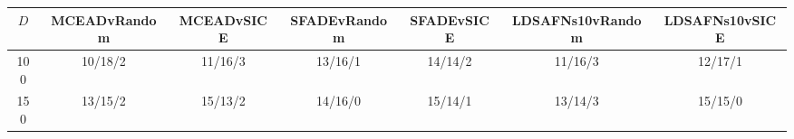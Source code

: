 \begin{tabular}{c c c c c c c}\hline\hline
	$D$	&	MCEADvRandom	&	MCEADvSICE	&	SFADEvRandom	&	SFADEvSICE	&	LDSAFNs10vRandom	&	LDSAFNs10vSICE	\\ \hline
	100	&	10/18/2	&	11/16/3	&	13/16/1	&	14/14/2	&	11/16/3	&	12/17/1	\\
	150	&	13/15/2	&	15/13/2	&	14/16/0	&	15/14/1	&	13/14/3	&	15/15/0	\\ \hline
\end{tabular}